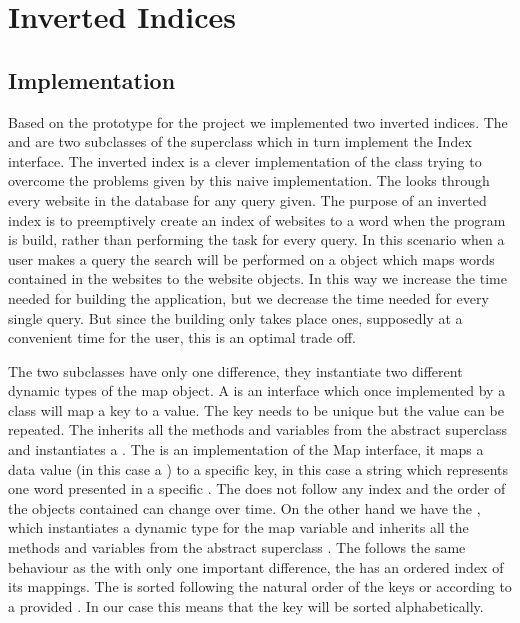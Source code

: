 \section{Inverted Indices}

\subsection{Implementation}
Based on the prototype for the project we implemented two inverted indices. The  and  are two subclasses of the superclass  which in turn implement the Index interface. The inverted index is a clever implementation of the  class trying to overcome the problems given by this naive implementation. The  looks through every website in the database for any query given. The purpose of an inverted index is to preemptively create an index of websites to a word when the program is build, rather than performing the task for every query. In this scenario when a user makes a query the search will be performed on a  object which maps words contained in the websites to the website objects. In this way we increase the time needed for building the application, but we decrease the time needed for every single query. But since the building only takes place ones, supposedly at a convenient time for the user, this is an optimal trade off.

The two subclasses have only one difference, they instantiate two different dynamic types of the map object. A  is an interface which once implemented by a class will map a key to a value. The key needs to be unique but the value can be repeated.
The  inherits all the methods and variables from the abstract superclass  and instantiates a . The  is an implementation of the Map interface, it maps a data value (in this case a ) to a specific key, in this case a string which represents one word presented in a specific . The  does not follow any index and the order of the objects contained can change over time.
On the other hand we have the , which instantiates a  dynamic type for the map variable and inherits all the methods and variables from the abstract superclass . The  follows the same behaviour as the  with only one important difference, the  has an ordered index of its mappings. The  is sorted following the natural order of the keys or according to a provided . In our case this means that the  key will be sorted alphabetically.

